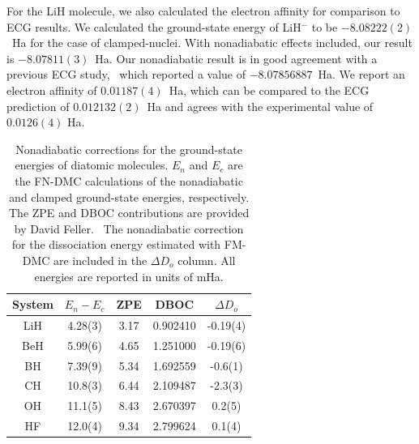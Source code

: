 For the LiH molecule, we also calculated the electron affinity for comparison to ECG results. We calculated the ground-state energy of LiH$^-$ to be $-8.08222(2)$~Ha for the case of clamped-nuclei. With nonadiabatic effects included, our result is  $-8.07811(3)$~Ha. Our nonadiabatic result is in good agreement with a previous ECG study,~\cite{Bubin_LiH-_noBO} which reported a value of $-8.07856887$~Ha. We report an electron affinity of $0.01187(4)$~Ha, which can be compared to the ECG prediction of $0.012132(2)$~Ha and agrees with the experimental value of $0.0126(4)$ Ha.~\cite{switch}

\begin{table}[h]
\setlength{\extrarowheight}{1pt}
\caption{Nonadiabatic corrections for the ground-state energies of diatomic molecules. $E_n$ and $E_c$ are the FN-DMC calculations of the nonadiabatic and clamped ground-state energies, respectively. The ZPE and DBOC contributions are provided by David Feller.~\cite{fell1} The nonadiabatic correction for the dissociation energy estimated with FM-DMC are included in the $\Delta D_o$ column. All energies are reported in units of mHa.\label{tab:nad-ad-diatomics}}
\begin{tabular}{ccccc}
\hline\hline
System & $E_n-E_c$ &   ZPE &      DBOC & $\Delta D_o$\\ \hline
LiH  &   4.28(3) &  3.17 &  0.902410 & -0.19(4) \\
BeH  &   5.99(6) &  4.65 &  1.251000 & -0.19(6) \\
BH   &   7.39(9) &  5.34 &  1.692559 & -0.6(1) \\
CH   &  10.8(3) &  6.44 &  2.109487  & -2.3(3)  \\
OH   &  11.1(5) &  8.43 &  2.670397  &  0.2(5)  \\
HF   &  12.0(4) &  9.34 &  2.799624  &  0.1(4)  \\
\hline\hline
\end{tabular}
\end{table}

